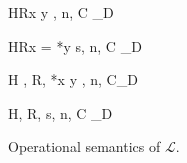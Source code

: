 \begin{figure}
\begin{minipage}{\textwidth}
\begin{minipage}{0.5\textwidth}
{\langle H\coma R\coma  *x \leftarrow y , n, C\rangle
  \longrightarrow_{D} \MEMEX }
\end{minipage}
\begin{minipage}{0.5\textwidth}
{\langle H\coma R\coma  \LET x = *y \; \IN s, n, C\rangle
    \longrightarrow_{D} \MEMEX}
\end{minipage}


{ \langle H , R, *x \leftarrow y , n, C\rangle \xlongrightarrow{}_{D}
  \CONSTEX}

{\langle H, R, \scon\Sirx s, n, C \rangle \xlongrightarrow{\rho}_{D} \CONSTEX }


\end{minipage}

\caption{Operational semantics of \(\mathcal{L}\).}
\label{fig:transitionRules}
\end{figure}
